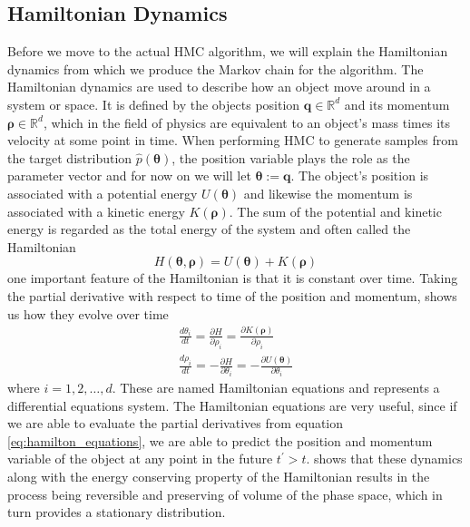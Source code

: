 \subsection{Hamiltonian Dynamics}
Before we move to the actual HMC algorithm, we will explain the Hamiltonian dynamics from which we produce the Markov chain for the algorithm. The Hamiltonian dynamics are used to describe how an object move around in a system or space. It is defined by the objects position $\boldsymbol{q}\in \mathbb{R}^d$ and its momentum $\boldsymbol{\rho}\in \mathbb{R}^d$, which in the field of physics are equivalent to an object's mass times its velocity at some point in time. When performing HMC to generate samples from the target distribution $\hat{p}(\boldsymbol{\theta})$, the position variable plays the role as the parameter vector and for now on we will let $\boldsymbol{\theta}:=\boldsymbol{q}$. The object's position is associated with a potential energy $U(\boldsymbol{\theta})$ and likewise the momentum is associated with a kinetic energy $K(\boldsymbol{\rho})$. The sum of the potential and kinetic energy is regarded as the total energy of the system and often called the Hamiltonian
\begin{equation*}
H(\boldsymbol{\theta},\boldsymbol{\rho})=U(\boldsymbol{\theta})+K(\boldsymbol{\rho})    
\end{equation*}       
one important feature of the Hamiltonian is that it is constant over time. Taking the partial derivative with respect to time of the position and momentum, shows us how they evolve over time
\begin{equation}\label{eq:hamilton_equations}
\begin{split}
\frac{d \theta_{i}}{d t}=\frac{\partial H}{\partial \rho_{i}}=\frac{\partial K(\boldsymbol{\rho})}{\partial \rho_{i}} \\
\frac{d \rho_{i}}{d t}=-\frac{\partial H}{\partial \theta_{i}}=-\frac{\partial U(\boldsymbol{\theta})}{\partial \theta_{i}}
\end{split}
\end{equation}
where $i=1,2, \ldots,d$. These are named Hamiltonian equations and represents a differential equations system. The Hamiltonian equations are very useful, since if we are able to evaluate the partial derivatives from equation \ref{eq:hamilton_equations}, we are able to predict the position and momentum variable of the object at any point in the future $t^\prime>t$. \cite{neal2012bayesian} shows that these dynamics along with the energy conserving property of the Hamiltonian results in the process being reversible and preserving of volume of the phase space, which in turn provides a stationary distribution. 


